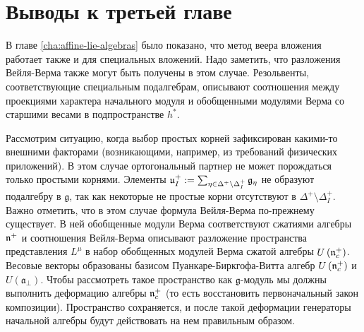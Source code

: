 \section{Выводы к третьей главе}

\label{sec:conclusions}
В главе \ref{cha:affine-lie-algebras}  было показано, что метод веера вложения работает также и для специальных вложений. Надо заметить, что  разложения Вейля-Верма также могут быть получены в этом случае. Резольвенты, соответствующие специальным подалгебрам, описывают соотношения между проекциями характера начального модуля и обобщенными модулями Верма со старшими весами в подпространстве $h^*$.

Рассмотрим ситуацию, когда выбор простых корней зафиксирован какими-то внешними факторами (возникающими, например, из требований физических приложений). В этом случае ортогональный партнер не может порождаться только простыми корнями. Элементы   $\frak{u}_{I}^{+}:=\sum_{\eta \in \Delta
^{+}\setminus \Delta _{I}^{+}}\frak{g}_{\eta }$ не образуют подалгебру в  $%
\mathfrak{g}$, так как некоторые не простые корни отсутствуют в  $\Delta ^{+}\setminus
\Delta _{I}^{+}$. Важно отметить, что в этом случае формула Вейля-Верма по-прежнему существует. В ней обобщенные модули Верма соответствуют сжатиями \cite{Doebner1967Melsheimer} алгебры $%
\frak{n}^{+}$ и соотношения Вейля-Верма описывают разложение пространства представления $L^{\mu}$ в набор обобщенных модулей Верма сжатой алгебры  $U\left(\frak{n}_c^{+}\right)$. Весовые векторы образованы базисом Пуанкаре-Биркгофа-Витта алгебр $U\left(\frak{n}_c^{+}\right)$ и
$U\left( \mathfrak{a}_{\bot} \right)$. Чтобы рассмотреть такое пространство как  $%
\mathfrak{g}$-модуль мы должны выполнить деформацию \cite
{Nijenhuis1966Richardson} алгебры $\frak{n}_c^{+}$ (то есть восстановить первоначальный закон композиции). Пространство сохраняется, и после такой деформации генераторы начальной алгебры будут действовать на нем правильным образом.



